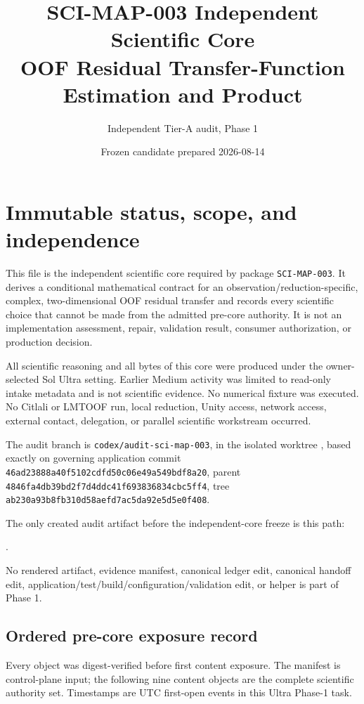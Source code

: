 \documentclass[11pt]{article}
\title{SCI-MAP-003 Independent Scientific Core\\
OOF Residual Transfer-Function Estimation and Product}
\author{Independent Tier-A audit, Phase 1}
\date{Frozen candidate prepared 2026-08-14}
\begin{document}
\maketitle

\section{Immutable status, scope, and independence}

This file is the independent scientific core required by package
\texttt{SCI-MAP-003}.  It derives a conditional mathematical contract for an
observation/reduction-specific, complex, two-dimensional OOF residual transfer
and records every scientific choice that cannot be made from the admitted
pre-core authority.  It is not an implementation assessment, repair,
validation result, consumer authorization, or production decision.

All scientific reasoning and all bytes of this core were produced under the
owner-selected Sol Ultra setting.  Earlier Medium activity was limited to
read-only intake metadata and is not scientific evidence.  No numerical
fixture was executed.  No Citlali or LMTOOF run, local reduction, Unity access,
network access, external contact, delegation, or parallel scientific
workstream occurred.

The audit branch is \texttt{codex/audit-sci-map-003}, in the isolated worktree
, based exactly on governing
application commit
\texttt{46ad23888a40f5102cdfd50c06e49a549bdf8a20}, parent
\texttt{4846fa4db39bd2f7d4ddc41f693836834cbc5ff4}, tree
\texttt{ab230a93b8fb310d58aefd7ac5da92e5d5e0f408}.

The only created audit artifact before the independent-core freeze is this
path:
\begin{center}
.
\end{center}
No rendered artifact, evidence manifest, canonical ledger edit, canonical
handoff edit, application/test/build/configuration/validation edit, or helper
is part of Phase 1.

\subsection{Ordered pre-core exposure record}

Every object was digest-verified before first content exposure.  The manifest
is control-plane input; the following nine content objects are the complete
scientific authority set.  Timestamps are UTC first-open events in this Ultra
Phase-1 task.
\end{document}
